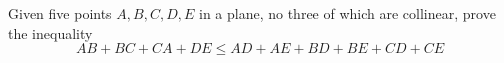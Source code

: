 Given five points $A,B,C,D,E$ in a plane, no three of which are collinear, prove the inequality\[AB+BC+CA+DE\le AD+AE+BD+BE+CD+CE \]